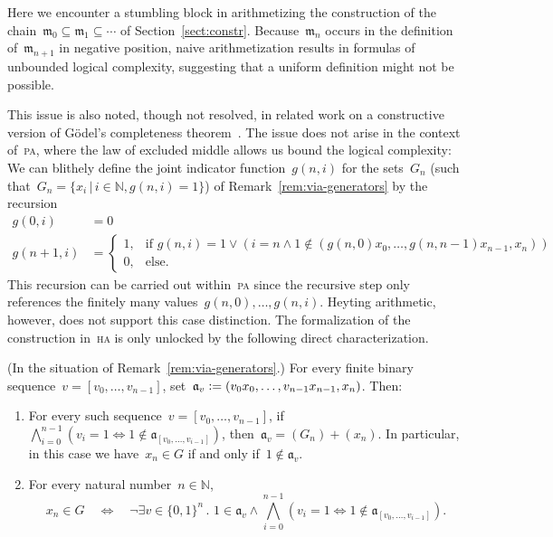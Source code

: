 \documentclass[envcountsect,envcountsame,runningheads]{llncs}
\newcommand{\aaa}{\mathfrak{a}}
\newcommand{\mmm}{\mathfrak{m}}
\newcommand{\NN}{\mathbb{N}}
\newcommand{\defeq}{\vcentcolon=}
\renewcommand{\_}{\mathpunct{.}\,}
\begin{document}
Here we encounter a stumbling block in arithmetizing the
construction of the chain~$\mmm_0 \subseteq \mmm_1 \subseteq \cdots$
of Section~\ref{sect:constr}. Because~$\mmm_n$ occurs in the
definition of~$\mmm_{n+1}$ in negative position, naive arithmetization
results in formulas of unbounded logical complexity, suggesting that
a uniform definition might not be possible.

This issue is also noted, though not resolved, in related work on a
constructive version of Gödel's completeness
theorem~\cite[p.~11]{herbelin-ilik:henkin}.
The issue does not arise in the context of~\textsc{pa}, where the law of
excluded middle allows us bound the logical complexity: We can blithely define
the joint indicator function~$g(n,i)$ for the sets~$G_n$ (such that~$G_n = \{
x_i \,|\, i \in \NN, g(n,i) = 1 \}$) of Remark~\ref{rem:via-generators} by the recursion
\begin{align*}
  g(0,i) &= 0 \\
  g(n+1,i) &= \begin{cases}
    1, & \text{if $g(n,i) = 1 \vee (i = n \wedge 1 \not\in
    (g(n,0)x_0,\ldots,g(n,n-1)x_{n-1},x_n))$} \\
    0, & \text{else.}
  \end{cases}
\end{align*}
This recursion can be carried out within~\textsc{pa} since the recursive step
only references the finitely many values~$g(n,0),\ldots,g(n,i)$.
Heyting arithmetic, however, does not support this case distinction. The
formalization of the construction in~\textsc{ha} is only unlocked by the following
direct characterization.

\begin{lemma}\label{lemma:uniform-char}(In the situation of Remark~\ref{rem:via-generators}.)
For every finite binary sequence~$v = [v_0,\ldots,v_{n-1}]$, set~$\aaa_v
\defeq (v_0x_0,\ldots,v_{n-1}x_{n-1},x_n)$. Then:
\begin{enumerate}
\item For every such sequence~$v = [v_0,\ldots,v_{n-1}]$, if
$\bigwedge_{i=0}^{n-1} (v_i = 1 \Leftrightarrow 1 \not\in \aaa_{[v_0,\ldots,v_{i-1}]})$,
then~$\aaa_v = (G_n) + (x_n)$.
In particular, in this case we have~$x_n \in G$ if and only if~$1 \not\in \aaa_v$.
\item For every natural number~$n \in \NN$,
\vspace*{-1.2em}
\[ x_n \in G \quad\Longleftrightarrow\quad \neg
  \exists v \in \{0,1\}^n\_
    1 \in \aaa_v \wedge
      \bigwedge_{i=0}^{n-1} (v_i = 1 \Leftrightarrow 1 \not\in \aaa_{[v_0,\ldots,v_{i-1}]}). \]
\end{enumerate}
\end{lemma}
\end{document}
